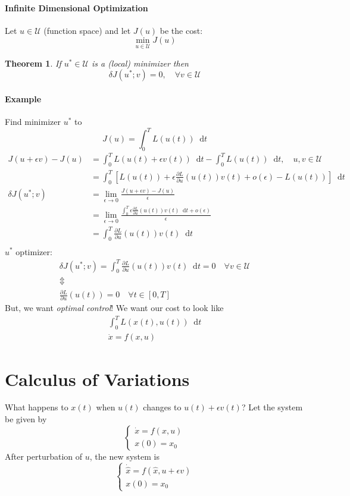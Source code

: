 \documentclass[letterpaper,12pt,titlepage]{report}
\newcommand*\dif{\mathop{}\!\mathrm{d}}
\newcommand*\pder[2]{\frac{\partial #1}{\partial #2}}
\theoremstyle{plain}
\newtheorem*{thm}{Theorem}
\theoremstyle{definition}
\begin{document}
\paragraph{Infinite Dimensional Optimization}
Let $u\in\mathcal U$ (function space) and let $J(u)$ be the cost:
\[ \min_{u\in\mathcal U} J(u) \]

\begin{thm}
  If $u^*\in\mathcal U$ is a (local) minimizer then
  \[ \delta J(u^*;v) = 0, \quad \forall v\in\mathcal U \]
\end{thm}

\paragraph{Example} Find minimizer $u^*$ to
\[ J(u) = \int_0^T L(u(t)) \dif t \]
\begin{align}
  J(u+\epsilon v) - J(u) &= \int_0^T L(u(t)+\epsilon v(t)) \dif t - \int_0^T L(u(t)) \dif t, \quad u,v\in\mathcal U \\
                         &= \int_0^T \left[ L(u(t)) + \epsilon \pder{L}{u}(u(t)) v(t) + o(\epsilon) - L(u(t)) \right] \dif t \\
  \delta J(u^*;v) &= \lim_{\epsilon\to0} \frac{J(u+\epsilon v)-J(u)}{\epsilon} \\
                         &= \lim_{\epsilon\to0} \frac{\int_0^T \epsilon \pder{L}{u}(u(t)) v(t) \dif t + o(\epsilon)}{\epsilon} \\
                         &= \int_0^T \pder{L}{u}(u(t)) v(t) \dif t \\
\end{align}
$u^*$ optimizer:
\begin{gather}
  \delta J(u^*;v) = \int_0^T \pder{L}{u}(u(t)) v(t) \dif t = 0 \quad \forall v\in\mathcal U \\
  \Updownarrow \\
  \pder{L}{u} (u(t)) = 0 \quad \forall t\in[0,T]
\end{gather}
But, we want \emph{optimal control}! We want our cost to look like
\begin{gather}
  \int_0^T L(x(t),u(t)) \dif t \\
  \dot x = f(x,u)
\end{gather}

\section{Calculus of Variations}
What happens to $x(t)$ when $u(t)$ changes to $u(t)+\epsilon v(t)$? Let the system be given by
\[ \begin{cases}
    \dot x = f(x,u) \\
    x(0) = x_0
  \end{cases} \]
After perturbation of $u$, the new system is
\[ \begin{cases}
    \dot{\hat x} = f(\hat x,u+\epsilon v) \\
    x(0) = x_0
  \end{cases} \]
\end{document}
